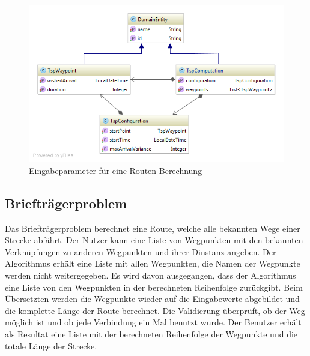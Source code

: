 \begin{figure}[h]
\centering
\includegraphics[scale=0.5]{images/probleme/tsp.png}
\caption[Eingabeparameter für eine Routen Berechnung]{Eingabeparameter für eine Routen Berechnung \selfmade{}}
\label{fig:tsp_input}
\end{figure}

%
%
%
%

\subsection{Briefträgerproblem}
Das Briefträgerproblem berechnet eine Route, welche alle bekannten Wege einer Strecke abfährt. Der Nutzer kann eine Liste von Wegpunkten mit den bekannten Verknüpfungen zu anderen 
Wegpunkten und ihrer Dinstanz angeben. Der Algorithmus erhält eine Liste mit allen Wegpunkten, die Namen der Wegpunkte werden nicht weitergegeben. Es wird davon ausgegangen, dass 
der Algorithmus eine Liste von den Wegpunkten in der berechneten Reihenfolge zurückgibt. Beim Übersetzten werden die Wegpunkte wieder auf die Eingabewerte abgebildet und die komplette 
Länge der Route berechnet. Die Validierung überprüft, ob der Weg möglich ist und ob jede Verbindung ein Mal benutzt wurde. Der Benutzer erhält als Resultat eine Liste mit der berechneten 
Reihenfolge der Wegpunkte und die totale Länge der Strecke.

